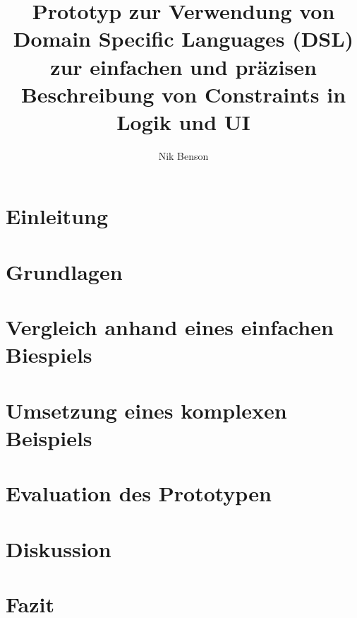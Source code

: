 \documentclass[12pt]{article}
\title{Prototyp zur Verwendung von Domain Specific Languages (DSL) zur einfachen und präzisen Beschreibung von Constraints in Logik und UI}
\author{Nik Benson}
\affil{\href{mailto:nik.benson@studmail.w-hs.de}{nik.benson@studmail.w-hs.de}}
\begin{document}
    

    




    \section{Einleitung}\label{sec:einleitung}
    


    \section{Grundlagen}\label{sec:grundlagen}
    


    \section{Vergleich anhand eines einfachen Biespiels}\label{sec:vergleich-anhand-eines-einfachen-biespiels}
    


    \section{Umsetzung eines komplexen Beispiels}\label{sec:umsetzung-eines-komplexen-beispiels}
    


    \section{Evaluation des Prototypen}\label{sec:evaluation-des-prototypen}
    


    \section{Diskussion}\label{sec:diskussion}
    


    \section{Fazit}\label{sec:fazit}
    

    

    
\end{document}
